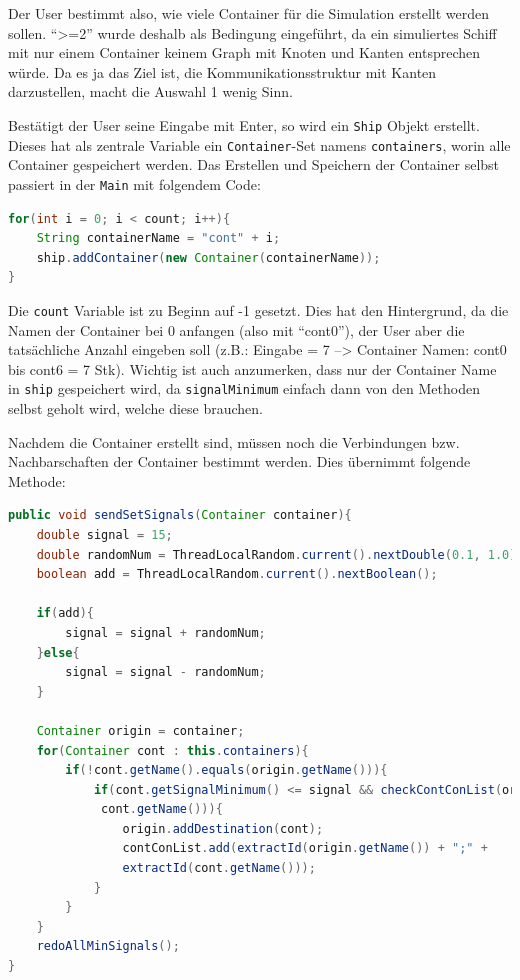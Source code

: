 \documentclass[
    headings=optiontotocandhead,%
    twoside,
    numbers=noenddot,%
    12pt, %
    titlepage, %
    parskip=full, %
    listof=leveldown, 
    numbers=noenddot, %
    a4paper,DIV=14,
    BCOR=15mm,
]{scrbook}
\newcommand{\passthrough}[1]{#1}
\begin{document}
Der User bestimmt also, wie viele Container für die Simulation erstellt
werden sollen. ``\textgreater=2'' wurde deshalb als Bedingung
eingeführt, da ein simuliertes Schiff mit nur einem Container keinem
Graph mit Knoten und Kanten entsprechen würde. Da es ja das Ziel ist,
die Kommunikationsstruktur mit Kanten darzustellen, macht die Auswahl 1
wenig Sinn.

Bestätigt der User seine Eingabe mit Enter, so wird ein
\passthrough{\lstinline!Ship!} Objekt erstellt. Dieses hat als zentrale
Variable ein \passthrough{\lstinline!Container!}-Set namens
\passthrough{\lstinline!containers!}, worin alle Container gespeichert
werden. Das Erstellen und Speichern der Container selbst passiert in der
\passthrough{\lstinline!Main!} mit folgendem Code:

\begin{lstlisting}[language=Java, caption={Code zum Erstellen der Container}]
for(int i = 0; i < count; i++){
    String containerName = "cont" + i;
    ship.addContainer(new Container(containerName));
}
\end{lstlisting}

Die \passthrough{\lstinline!count!} Variable ist zu Beginn auf -1
gesetzt. Dies hat den Hintergrund, da die Namen der Container bei 0
anfangen (also mit ``cont0''), der User aber die tatsächliche Anzahl
eingeben soll (z.B.: Eingabe = 7 --\textgreater{} Container Namen: cont0
bis cont6 = 7 Stk). Wichtig ist auch anzumerken, dass nur der Container
Name in \passthrough{\lstinline!ship!} gespeichert wird, da
\passthrough{\lstinline!signalMinimum!} einfach dann von den Methoden
selbst geholt wird, welche diese brauchen.

Nachdem die Container erstellt sind, müssen noch die Verbindungen bzw.
Nachbarschaften der Container bestimmt werden. Dies übernimmt folgende
Methode:

\begin{lstlisting}[language=Java, caption={Methode welche die Verbindungen zwischen einzelnen Containern erstellt}]
public void sendSetSignals(Container container){
    double signal = 15;
    double randomNum = ThreadLocalRandom.current().nextDouble(0.1, 1.0);
    boolean add = ThreadLocalRandom.current().nextBoolean();
  
    if(add){
        signal = signal + randomNum;
    }else{
        signal = signal - randomNum;
    }
  
    Container origin = container;
    for(Container cont : this.containers){
        if(!cont.getName().equals(origin.getName())){
            if(cont.getSignalMinimum() <= signal && checkContConList(origin.getName(),
             cont.getName())){
                origin.addDestination(cont);
                contConList.add(extractId(origin.getName()) + ";" +
                extractId(cont.getName()));
            }
        }
    }
    redoAllMinSignals();
}
\end{lstlisting}
\end{document}

